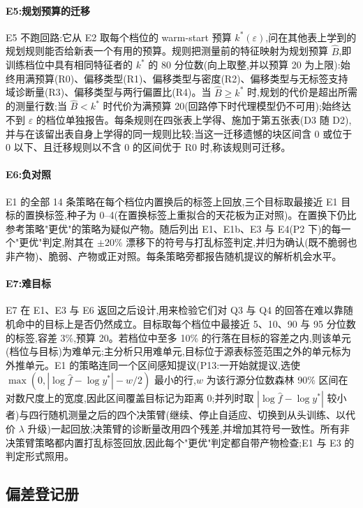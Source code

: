 \documentclass[11pt,a4paper]{ctexart}
\begin{document}
\paragraph{E5:规划预算的迁移} E5 不跑回路:它从 E2 取每个档位的 warm-start 预算 $k^{*}(\varepsilon)$,问在其他表上学到的规划规则能否给新表一个有用的预算。规则把测量前的特征映射为规划预算 $\hat B$,即训练档位中具有相同特征者的 $k^{*}$ 的 80 分位数(向上取整,并以预算 20 为上限):始终用满预算(R0)、偏移类型(R1)、偏移类型与密度(R2)、偏移类型与无标签支持域诊断量(R3)、偏移类型与两行偏置比(R4)。当 $\hat B \ge k^{*}$ 时,规划的代价是超出所需的测量行数;当 $\hat B < k^{*}$ 时代价为满预算 20(回路停下时代理模型仍不可用);始终达不到 $\varepsilon$ 的档位单独报告。每条规则在四张表上学得、施加于第五张表(D3 随 D2),并与在该留出表自身上学得的同一规则比较;当这一迁移遗憾的块区间含 0 或位于 0 以下、且迁移规则以不含 0 的区间优于 R0 时,称该规则可迁移。

\paragraph{E6:负对照} E1 的全部 14 条策略在每个档位内置换后的标签上回放,三个目标取最接近 E1 目标的置换标签,种子为 0--4(在置换标签上重拟合的天花板为正对照)。在置换下仍比参考策略"更优"的策略为疑似产物。随后列出 E1、E1b、E3 与 E4(P2 下)的每一个"更优"判定,附其在 $\pm 20\%$ 漂移下的符号与打乱标签判定,并归为确认(既不脆弱也非产物)、脆弱、产物或正对照。每条策略旁都报告随机提议的解析机会水平。

\paragraph{E7:难目标} E7 在 E1、E3 与 E6 返回之后设计,用来检验它们对 Q3 与 Q4 的回答在难以靠随机命中的目标上是否仍然成立。目标取每个档位中最接近 5、10、90 与 95 分位数的标签,容差 3\%,预算 20。若档位中至多 10\% 的行落在目标的容差之内,则该单元(档位与目标)为难单元;主分析只用难单元,目标位于源表标签范围之外的单元标为外推单元。E1 的策略连同一个区间感知提议(P13:一开始就提议,选使 $\max(0, |\log \hat f - \log y^{*}| - w/2)$ 最小的行,$w$ 为该行源分位数森林 90\% 区间在对数尺度上的宽度,因此区间覆盖目标记为距离 0;并列时取 $|\log \hat f - \log y^{*}|$ 较小者)与四行随机测量之后的四个决策臂(继续、停止自适应、切换到从头训练、以代价 $\lambda$ 升级)一起回放;决策臂的诊断量改用四个残差,并增加其符号一致性。所有非决策臂策略都内置打乱标签回放,因此每个"更优"判定都自带产物检查;E1 与 E3 的判定形式照用。

\subsection{偏差登记册}
\label{sec:deviations}
\end{document}
